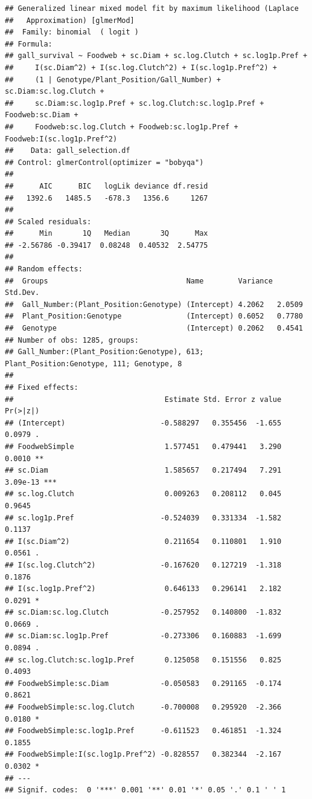 \documentclass[]{elsarticle} %
\begin{document}
\begin{verbatim}
## Generalized linear mixed model fit by maximum likelihood (Laplace
##   Approximation) [glmerMod]
##  Family: binomial  ( logit )
## Formula: 
## gall_survival ~ Foodweb + sc.Diam + sc.log.Clutch + sc.log1p.Pref +  
##     I(sc.Diam^2) + I(sc.log.Clutch^2) + I(sc.log1p.Pref^2) +  
##     (1 | Genotype/Plant_Position/Gall_Number) + sc.Diam:sc.log.Clutch +  
##     sc.Diam:sc.log1p.Pref + sc.log.Clutch:sc.log1p.Pref + Foodweb:sc.Diam +  
##     Foodweb:sc.log.Clutch + Foodweb:sc.log1p.Pref + Foodweb:I(sc.log1p.Pref^2)
##    Data: gall_selection.df
## Control: glmerControl(optimizer = "bobyqa")
## 
##      AIC      BIC   logLik deviance df.resid 
##   1392.6   1485.5   -678.3   1356.6     1267 
## 
## Scaled residuals: 
##      Min       1Q   Median       3Q      Max 
## -2.56786 -0.39417  0.08248  0.40532  2.54775 
## 
## Random effects:
##  Groups                                Name        Variance Std.Dev.
##  Gall_Number:(Plant_Position:Genotype) (Intercept) 4.2062   2.0509  
##  Plant_Position:Genotype               (Intercept) 0.6052   0.7780  
##  Genotype                              (Intercept) 0.2062   0.4541  
## Number of obs: 1285, groups:  
## Gall_Number:(Plant_Position:Genotype), 613; Plant_Position:Genotype, 111; Genotype, 8
## 
## Fixed effects:
##                                   Estimate Std. Error z value Pr(>|z|)    
## (Intercept)                      -0.588297   0.355456  -1.655   0.0979 .  
## FoodwebSimple                     1.577451   0.479441   3.290   0.0010 ** 
## sc.Diam                           1.585657   0.217494   7.291 3.09e-13 ***
## sc.log.Clutch                     0.009263   0.208112   0.045   0.9645    
## sc.log1p.Pref                    -0.524039   0.331334  -1.582   0.1137    
## I(sc.Diam^2)                      0.211654   0.110801   1.910   0.0561 .  
## I(sc.log.Clutch^2)               -0.167620   0.127219  -1.318   0.1876    
## I(sc.log1p.Pref^2)                0.646133   0.296141   2.182   0.0291 *  
## sc.Diam:sc.log.Clutch            -0.257952   0.140800  -1.832   0.0669 .  
## sc.Diam:sc.log1p.Pref            -0.273306   0.160883  -1.699   0.0894 .  
## sc.log.Clutch:sc.log1p.Pref       0.125058   0.151556   0.825   0.4093    
## FoodwebSimple:sc.Diam            -0.050583   0.291165  -0.174   0.8621    
## FoodwebSimple:sc.log.Clutch      -0.700008   0.295920  -2.366   0.0180 *  
## FoodwebSimple:sc.log1p.Pref      -0.611523   0.461851  -1.324   0.1855    
## FoodwebSimple:I(sc.log1p.Pref^2) -0.828557   0.382344  -2.167   0.0302 *  
## ---
## Signif. codes:  0 '***' 0.001 '**' 0.01 '*' 0.05 '.' 0.1 ' ' 1
\end{verbatim}
\end{document}
